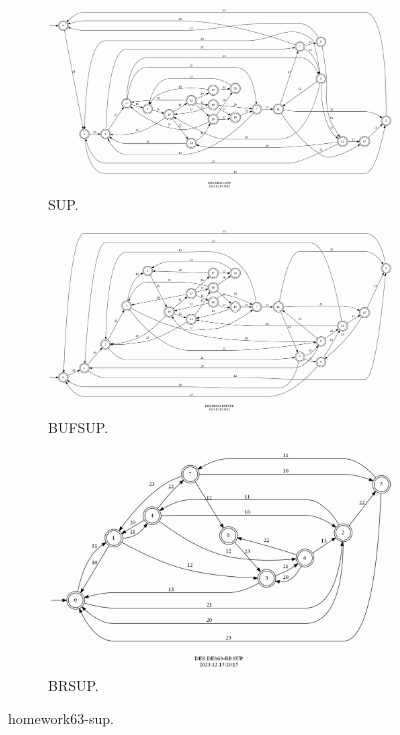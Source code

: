 \documentclass{article}
\begin{document}
\begin{figure}[h!]
  \centering
  \begin{subfigure}{0.6\linewidth}
    \includegraphics[width=\linewidth]{assets/DES63-SUP.jpg}
     \caption{SUP.}
  \end{subfigure}
  \begin{subfigure}{0.6\linewidth}
    \includegraphics[width=\linewidth]{assets/DES63-BUFSUP.jpg}
     \caption{BUFSUP.}
  \end{subfigure}
  \begin{subfigure}{0.6\linewidth}
    \includegraphics[width=\linewidth]{assets/DES63-BRSUP.jpg}
    \caption{BRSUP.}
  \end{subfigure}
  \caption{homework63-sup.}
  \label{fig:des63-sup}
\end{figure}
\end{document}
